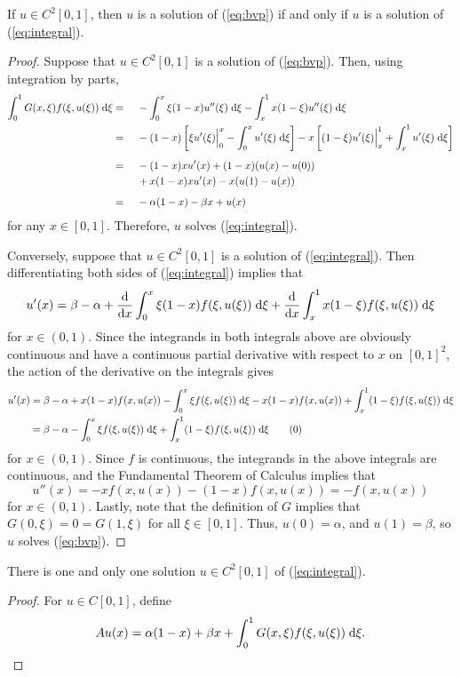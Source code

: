 \documentclass{homework}
\begin{document}
	\begin{romanparts}
		\questionpart If $u \in C^2[0,1]$, then $u$ is a solution of (\ref{eq:bvp}) if and only if $u$ is a solution of (\ref{eq:integral}).
		\begin{proof}
			Suppose that $u \in C^2[0,1]$ is a solution of (\ref{eq:bvp}). Then, using integration by parts,
			\begin{alignat*}{2}
				\int_0^1G(x,\xi)f(\xi, u(\xi))\;\text{d}\xi &{}={}&& -\int_0^x \xi(1-x)u''(\xi)\;\text{d}\xi - \int_x^1 x(1-\xi)u''(\xi)\;\text{d}\xi \\
				&{}={}&& -(1-x)\left[\xi u'(\xi)\Big\vert_0^x - \int_0^xu'(\xi)\;\text{d}\xi\right] - x\left[(1-\xi)u'(\xi)\Big\vert_x^1 + \int_x^1u'(\xi)\;\text{d}\xi\right] \\[0.5em]
				&{}={}&& -(1-x)xu'(x) + (1-x)(u(x) - u(0)) \\ 
				&&&{}+ x(1-x)xu'(x) - x(u(1) - u(x)) \\[0.5em]
				&{}={}&& -\alpha(1-x) - \beta x + u(x)
			\end{alignat*}
			for any $x \in [0,1]$. Therefore, $u$ solves (\ref{eq:integral}).
			
			Conversely, suppose that $u \in C^2[0,1]$ is a solution of (\ref{eq:integral}). Then differentiating both sides of (\ref{eq:integral}) implies that
			\begin{equation}
				u'(x) = \beta - \alpha + \frac{\text{d}}{\text{d} x}\int_0^x \xi(1-x)f(\xi, u(\xi))\;\text{d}\xi + \frac{\text{d}}{\text{d} x}\int_x^1 x(1-\xi)f(\xi,u(\xi))\;\text{d}\xi
			\end{equation}
			for $x \in (0,1)$. Since the integrands in both integrals above are obviously continuous and have a continuous partial derivative with respect to $x$ on $[0,1]^2$, the action of the derivative on the integrals gives
			\begin{align*}
				u'(x) &= \beta - \alpha + x(1-x)f(x,u(x)) -\int_0^x\xi f(\xi,u(\xi))\dee\xi - x(1-x)f(x,u(x))+\int_x^1(1-\xi)f(\xi,u(\xi))\dee\xi \\
				&= \beta - \alpha - \int_0^x\xi f(\xi,u(\xi))\dee\xi + \int_x^1(1-\xi)f(\xi,u(\xi))\dee\xi \tag{\arabic{equation}}\stepcounter{equation}
			\end{align*}
			for $x \in(0,1)$. Since $f$ is continuous, the integrands in the above integrals are continuous, and the Fundamental Theorem of Calculus implies that
			\begin{equation}
				u''(x) = -xf(x,u(x)) - (1-x)f(x,u(x)) = -f(x,u(x))
			\end{equation}
			for $x \in (0,1)$. Lastly, note that the definition of $G$ implies that $G(0,\xi) = 0 = G(1,\xi)$ for all $\xi \in [0,1]$. Thus, $u(0) = \alpha$, and $u(1) = \beta$, so $u$ solves (\ref{eq:bvp}).
		\end{proof}
		\questionpart There is one and only one solution $u \in C^2[0,1]$ of (\ref{eq:integral}).
		\begin{proof}
			For $u\in C[0,1]$, define
			\begin{equation}
				Au(x) = \alpha(1-x) + \beta x + \int_0^1G(x,\xi)f(\xi, u(\xi))\;\text{d}\xi.
			\end{equation}
		\end{proof}
	\end{romanparts}
\end{document}
